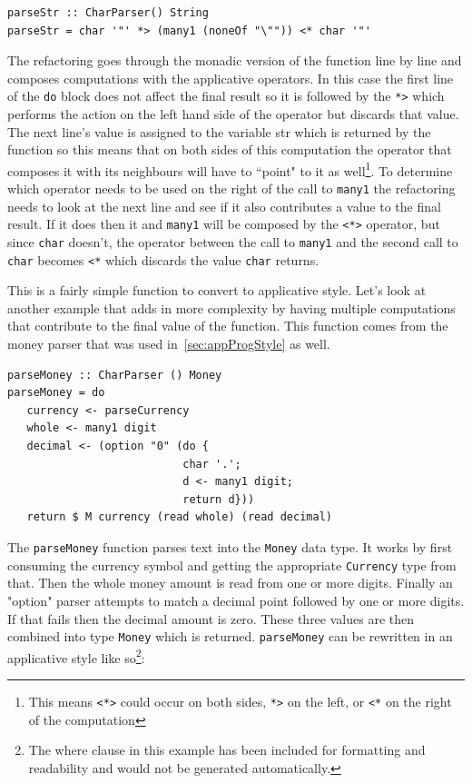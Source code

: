 \begin{lstlisting}[frame=tlrb]
parseStr :: CharParser() String
parseStr = char '"' *> (many1 (noneOf "\"")) <* char '"'
\end{lstlisting}

The refactoring goes through the monadic version of the function line by line and composes computations with the applicative operators. In this case the first line of the \texttt{do} block does not affect the final result so it is followed by the \texttt{*>} which performs the action on the left hand side of the operator but discards that value. The next line's value is assigned to the variable str which is returned by the function so this means that on both sides of this computation the operator that composes it with its neighbours will have to ``point" to it as well\footnote{This means \texttt{<*>} could occur on both sides, \texttt{*>} on the left, or \texttt{<*} on the right of the computation}. To determine which operator needs to be used on the right of the call to \texttt{many1} the refactoring needs to look at the next line and see if it also contributes a value to the final result. If it does then it and \texttt{many1} will be composed by the \texttt{<*>} operator, but since \texttt{char} doesn't, the operator between the call to \texttt{many1} and the second call to \texttt{char} becomes \texttt{<*} which discards the value \texttt{char} returns.

This is a fairly simple function to convert to applicative style. Let's look at another example that adds in more complexity by having multiple computations that contribute to the final value of the function. This function comes from the money parser that was used in~\ref{sec:appProgStyle} as well. 
\pagebreak
\begin{lstlisting}[frame=tlrb]
parseMoney :: CharParser () Money
parseMoney = do
   currency <- parseCurrency 
   whole <- many1 digit
   decimal <- (option "0" (do { 
                           char '.';
                           d <- many1 digit;
                           return d}))
   return $ M currency (read whole) (read decimal)
\end{lstlisting}

The \texttt{parseMoney} function parses text into the \texttt{Money} data type. It works by first consuming the currency symbol and getting the appropriate \texttt{Currency} type from that. Then the whole money amount is read from one or more digits. Finally an "option" parser attempts to match a decimal point followed by one or more digits. If that fails then the decimal amount is zero. These three values are then combined into type \texttt{Money} which is returned. \texttt{parseMoney} can be rewritten in an applicative style like so\footnote{The where clause in this example has been included for formatting and readability and would not be generated automatically.}:

